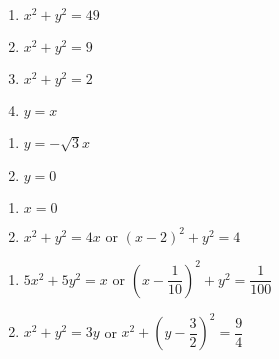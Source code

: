 \begin{multicols}{4}

\begin{enumerate}

\setcounter{enumi}{\value{HW}}

\item $x^{2} + y^{2} = 49$
\item $x^{2} + y^{2} = 9$
\item $x^{2} + y^{2} = 2$
\item $y=x$

\setcounter{HW}{\value{enumi}}

\end{enumerate}

\end{multicols}

\begin{multicols}{2}

\begin{enumerate}

\setcounter{enumi}{\value{HW}}

\item $y = -\sqrt{3}x$
\item $y=0$

\setcounter{HW}{\value{enumi}}

\end{enumerate}

\end{multicols}

\begin{multicols}{2}

\begin{enumerate}

\setcounter{enumi}{\value{HW}}

\item $x=0$
\item  $x^2 + y^2 = 4x$ or $(x-2)^2 + y^2 = 4$

\setcounter{HW}{\value{enumi}}

\end{enumerate}

\end{multicols}

\begin{multicols}{2}

\begin{enumerate}

\setcounter{enumi}{\value{HW}}

\item $5x^2 + 5y^2 = x$ or $\left(x - \dfrac{1}{10}\right)^2+y^2 = \dfrac{1}{100}$
\item $x^2 + y^2  = 3y$ or $x^2 + \left(y - \dfrac{3}{2}\right)^2 = \dfrac{9}{4}$

\setcounter{HW}{\value{enumi}}

\end{enumerate}

\end{multicols}

